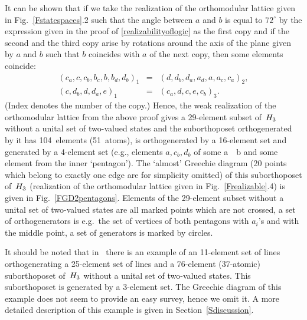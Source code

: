 It can be shown that if we take the realization of the orthomodular lattice
given in Fig.~\ref{Fstatespaces}.2 such that the angle between $a$ and $b$ is
equal to $72^\circ$ by the expression given in the proof of
\ref{realizabilityoflogic} as the first copy and if the second and the third
copy arise by rotations around the axis of the plane given by $a$ and $b$
such that $b$ coincides with $a$ of the next copy, then some elements
coincide:
  \begin {eqnarray*}
  (c_a, c  , c_b, b_c, b, b_d, d_b)_1 &=&
  (d  , d_b, d_a, a_d, a, a_c, c_a)_2 ,\\
  (c  , d_b, d  , d_a, e  )_1 &=&
  (c_a, d  , c  , e  , c_b)_3.
  \end {eqnarray*}
(Index denotes the number of the copy.) Hence, the weak realization of the
orthomodular lattice from the above proof gives a 29-element subset of~$H_3$
without a unital set of two-valued states and the suborthoposet
orthogenerated by it has 104~elements (51~atoms), is orthogenerated by a
16-element set and generated by a 4-element set (e.g., elements $a,c_b,d_b$
of some a~\usebox{\shortdiagram}~b and some element from the inner
`pentagon'). The `almost' Greechie diagram (20 points which belong to
exactly one edge are for simplicity omitted) of this suborthoposet of~$H_3$
(realization of the orthomodular lattice given in Fig.~\ref{Frealizable}.4)
is given in Fig.~\ref{FGD2pentagons}. Elements of the 29-element subset
without a unital set of two-valued states are all marked points which are
not crossed, a set of orthogenerators is e.g.\ the set of vertices of both
pentagons with $a_i$'s and with the middle point, a set of generators
is marked by circles.

It should be noted that in~\cite{Schuette,svozil-nat-acad} there is an
example of an 11-element set of lines orthogenerating a 25-element set of
lines and a 76-element (37-atomic) suborthoposet of~$H_3$ without a unital
set of two-valued states. This suborthoposet is generated by a 3-element
set. The Greechie diagram of this example does not seem to provide an easy
survey, hence we omit it. A more detailed description of this example is
given in Section~\ref{Sdiscussion}.


